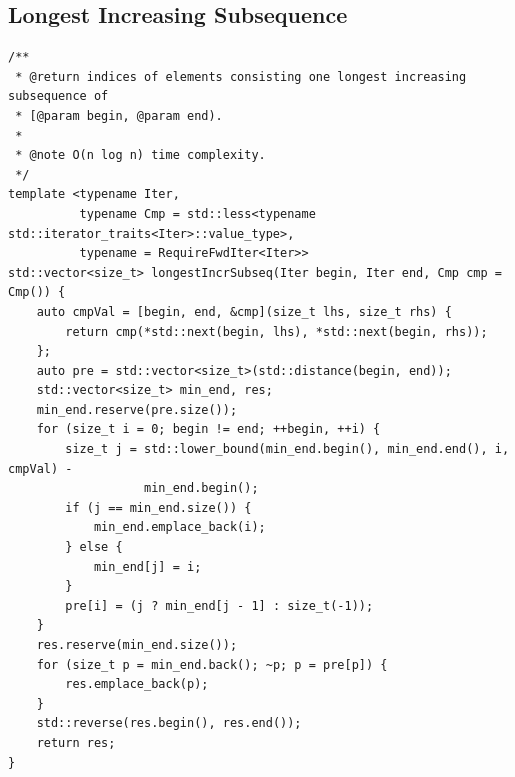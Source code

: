 \documentclass[UTF8]{article}
\begin{document}
\subsection{Longest Increasing Subsequence}
\begin{verbatim}
/**
 * @return indices of elements consisting one longest increasing subsequence of
 * [@param begin, @param end).
 * 
 * @note O(n log n) time complexity.
 */
template <typename Iter,
		  typename Cmp = std::less<typename std::iterator_traits<Iter>::value_type>,
		  typename = RequireFwdIter<Iter>>
std::vector<size_t> longestIncrSubseq(Iter begin, Iter end, Cmp cmp = Cmp()) {
	auto cmpVal = [begin, end, &cmp](size_t lhs, size_t rhs) {
		return cmp(*std::next(begin, lhs), *std::next(begin, rhs));
	};
	auto pre = std::vector<size_t>(std::distance(begin, end));
	std::vector<size_t> min_end, res;
	min_end.reserve(pre.size());
	for (size_t i = 0; begin != end; ++begin, ++i) {
		size_t j = std::lower_bound(min_end.begin(), min_end.end(), i, cmpVal) -
				   min_end.begin();
		if (j == min_end.size()) {
			min_end.emplace_back(i);
		} else {
			min_end[j] = i;
		}
		pre[i] = (j ? min_end[j - 1] : size_t(-1));
	}
	res.reserve(min_end.size());
	for (size_t p = min_end.back(); ~p; p = pre[p]) {
		res.emplace_back(p);
	}
	std::reverse(res.begin(), res.end());
	return res;
}
\end{verbatim}
\end{document}
